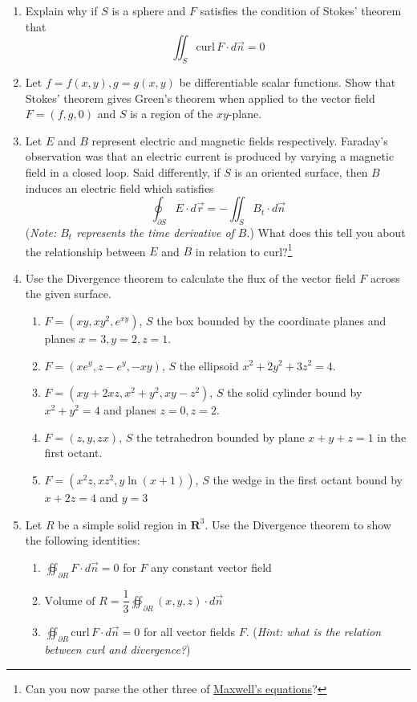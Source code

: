 \documentclass[12pt]{article}
\numberwithin{equation}{subsection}
\numberwithin{figure}{subsection}
\theoremstyle{note}
\newcommand{\curl}{\mathrm{curl\,}}
\begin{document}
{\begin{enumerate}[label=\arabic*.]
\begin{enumerate}
\end{enumerate}

\item Explain why if $S$ is a sphere and $F$ satisfies the condition of Stokes' theorem that \[\iint_{S} \curl F\cdot d\vec{n}=0\]
\item \label{stokes-greens} Let $f=f(x,y), g=g(x,y)$ be differentiable scalar functions. Show that Stokes' theorem gives Green's theorem when applied to the vector field $F=(f,g,0)$ and $S$ is a region of the $xy$-plane.

\item Let $E$ and $B$ represent electric and magnetic fields respectively. Faraday's observation was that an electric current is produced by varying a magnetic field in a closed loop. Said differently, if $S$ is an oriented surface, then $B$ induces an electric field which satisfies \[\oint_{\partial S} E\cdot d\vec{r}= -\iint_{S} B_t \cdot d\vec{n}\] (\textit{Note: $B_t$ represents the time derivative of $B$}.) What does this tell you about the relationship between $E$ and $B$ in relation to curl?\footnote{Can you now parse the other three of \href{https://en.wikipedia.org/wiki/Maxwell\%27s_equations\#Macroscopic_formulation 
}{Maxwell's equations}?}

\item Use the Divergence theorem to calculate the flux of the vector field $F$ across the given surface.

\begin{enumerate}
	\item $F=(xy, xy^2, e^{xy})$, $S$ the box bounded by the coordinate planes and planes $x=3, y=2, z=1$. 
	\item $F=(xe^y, z-e^y, -xy)$, $S$ the ellipsoid $x^2+2y^2+3z^2=4$.
	\item $F=(xy+2xz, x^2+y^2, xy-z^2)$, $S$ the solid cylinder bound by $x^2+y^2=4$ and planes $z=0, z=2$.
	\item $F=(z,y,zx)$, $S$ the tetrahedron bounded by plane $x+y+z=1$ in the first octant. 
	\item $F=(x^2z,xz^2, y\ln(x+1))$, $S$ the wedge in the first octant bound by $x+2z=4$ and $y=3$
\end{enumerate}

\item  Let $R$ be a simple solid region in $\mathbf{R}^3$. Use the Divergence theorem to show the following identities: 

\begin{enumerate}
	\item $\displaystyle \oiint_{\partial R} F\cdot d\vec{n}=0$ for $F$ any constant vector field
	\item $\displaystyle \text{Volume of $R$} = \dfrac{1}{3} \oiint_{\partial R} (x,y,z)\cdot d\vec{n}$\\
	\item $\displaystyle \oiint_{\partial R} \curl F\cdot d\vec{n}=0$ for all vector fields $F$. (\textit{Hint: what is the relation between curl and divergence?})


\end{enumerate}
\end{enumerate}}
\end{document}
